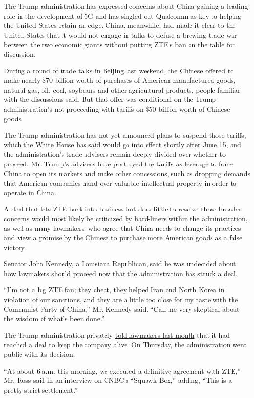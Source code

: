 The Trump administration has expressed concerns about China gaining a
leading role in the development of 5G and has singled out Qualcomm as
key to helping the United States retain an edge. China, meanwhile, had
made it clear to the United States that it would not engage in talks to
defuse a brewing trade war between the two economic giants without
putting ZTE's ban on the table for discussion.

During a round of trade talks in Beijing last weekend, the Chinese
offered to make nearly \$70 billion worth of purchases of American
manufactured goods, natural gas, oil, coal, soybeans and other
agricultural products, people familiar with the discussions said. But
that offer was conditional on the Trump administration's not proceeding
with tariffs on \$50 billion worth of Chinese goods.

The Trump administration has not yet announced plans to suspend those
tariffs, which the White House has said would go into effect shortly
after June 15, and the administration's trade advisers remain deeply
divided over whether to proceed. Mr. Trump's advisers have portrayed the
tariffs as leverage to force China to open its markets and make other
concessions, such as dropping demands that American companies hand over
valuable intellectual property in order to operate in China.

A deal that lets ZTE back into business but does little to resolve those
broader concerns would most likely be criticized by hard-liners within
the administration, as well as many lawmakers, who agree that China
needs to change its practices and view a promise by the Chinese to
purchase more American goods as a false victory.

Senator John Kennedy, a Louisiana Republican, said he was undecided
about how lawmakers should proceed now that the administration has
struck a deal.

``I'm not a big ZTE fan; they cheat, they helped Iran and North Korea in
violation of our sanctions, and they are a little too close for my taste
with the Communist Party of China,'' Mr. Kennedy said. ``Call me very
skeptical about the wisdom of what's been done.''

The Trump administration privately
\href{https://www.nytimes3xbfgragh.onion/2018/05/25/us/politics/trump-trade-zte.html}{told
lawmakers last month} that it had reached a deal to keep the company
alive. On Thursday, the administration went public with its decision.

``At about 6 a.m. this morning, we executed a definitive agreement with
ZTE,'' Mr. Ross said in an interview on CNBC's ``Squawk Box,'' adding,
``This is a pretty strict settlement.''

